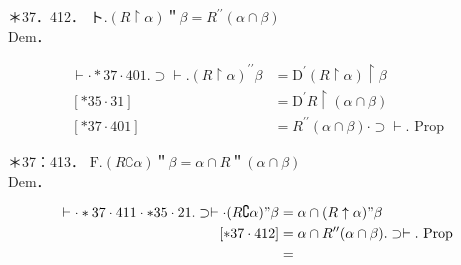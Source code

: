 \documentclass[10pt]{article}
\begin{document}
＊37．412． ト.$(R \upharpoonright \alpha)$＂$\beta=R^{\prime \prime}(\alpha \cap \beta)$\\
Dem．

$$
\begin{array}{ll}
\vdash \cdot * 37 \cdot 401 . \supset \vdash .(R \upharpoonright \alpha)^{\prime \prime} \beta & =\mathrm{D}^{\prime}(R \upharpoonright \alpha) \upharpoonright \beta \\
{[* 35 \cdot 31]} & =\mathrm{D}^{\prime} R \upharpoonright(\alpha \cap \beta) \\
{[* 37 \cdot 401]} & =R^{\prime \prime}(\alpha \cap \beta) \cdot \supset \vdash . \text { Prop }
\end{array}
$$

＊37：413． $\mathrm{F} .(R \complement \alpha)$＂$\beta=\alpha \cap R$＂$(\alpha \cap \beta)$\\
Dem．

$$
\begin{aligned}
\vdash \cdot * 37 \cdot 411 \cdot * 35 \cdot 21 . \supset \vdash \cdot(R \complement \alpha) " \beta & =\alpha \cap(R \uparrow \alpha) " \beta \\
{[* 37 \cdot 412] } & =\alpha \cap R^{\prime \prime}(\alpha \cap \beta) . \supset \vdash . \text { Prop } \\
& =
\end{aligned}
$$
\end{document}
